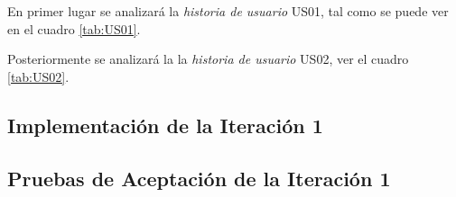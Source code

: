

En primer lugar se analizará la \emph{historia de usuario} US01, tal como se puede ver en el cuadro \ref{tab:US01}.

  

    


Posteriormente se analizará la la \emph{historia de usuario} US02, ver el cuadro \ref{tab:US02}.

  

    


\subsection{Implementación de la Iteración 1}

    

\subsection{Pruebas de Aceptación de la Iteración 1}




